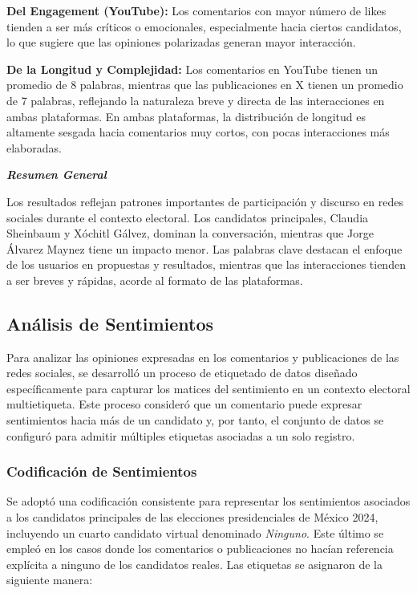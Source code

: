 \documentclass[10pt, a4paper]{article}
\begin{document}
	\textbf{Del Engagement (YouTube):} Los comentarios con mayor número de likes tienden a ser más críticos o emocionales, especialmente hacia ciertos candidatos, lo que sugiere que las opiniones polarizadas generan mayor interacción.
	
	\textbf{De la Longitud y Complejidad:} Los comentarios en YouTube tienen un promedio de 8 palabras, mientras que las publicaciones en X tienen un promedio de 7 palabras, reflejando la naturaleza breve y directa de las interacciones en ambas plataformas. En ambas plataformas, la distribución de longitud es altamente sesgada hacia comentarios muy cortos, con pocas interacciones más elaboradas.
	
	\textbf{\textit{Resumen General}}
	
	Los resultados reflejan patrones importantes de participación y discurso en redes sociales durante el contexto electoral. Los candidatos principales, Claudia Sheinbaum y Xóchitl Gálvez, dominan la conversación, mientras que Jorge Álvarez Maynez tiene un impacto menor. Las palabras clave destacan el enfoque de los usuarios en propuestas y resultados, mientras que las interacciones tienden a ser breves y rápidas, acorde al formato de las plataformas.
	
	\subsection{Análisis de Sentimientos}
	Para analizar las opiniones expresadas en los comentarios y publicaciones de las redes sociales, se desarrolló un proceso de etiquetado de datos diseñado específicamente para capturar los matices del sentimiento en un contexto electoral multietiqueta. Este proceso consideró que un comentario puede expresar sentimientos hacia más de un candidato y, por tanto, el conjunto de datos se configuró para admitir múltiples etiquetas asociadas a un solo registro.
	
	\subsubsection{Codificación de Sentimientos}
	
	Se adoptó una codificación consistente para representar los sentimientos asociados a los candidatos principales de las elecciones presidenciales de México 2024, incluyendo un cuarto candidato virtual denominado \textit{Ninguno}. Este último se empleó en los casos donde los comentarios o publicaciones no hacían referencia explícita a ninguno de los candidatos reales. Las etiquetas se asignaron de la siguiente manera:
	
\end{document}
